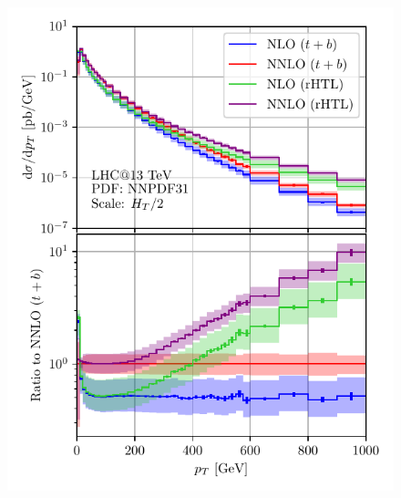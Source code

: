 \begin{figure}[ht]
\begin{minipage}[t]{0.49\textwidth}
  \includegraphics[width=\textwidth]{Images/pT_13000_bMS_tOS_cropped.pdf}
\end{minipage}
\begin{minipage}[t]{0.49\textwidth}

\end{minipage}
\end{figure}

